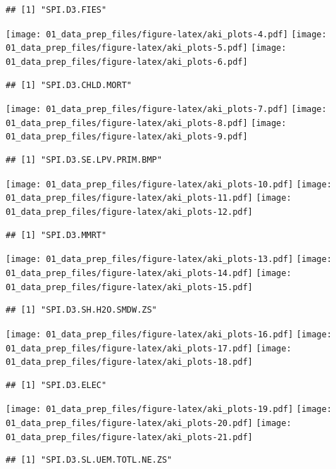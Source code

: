 \documentclass[]{article}
\begin{document}
\begin{verbatim}
## [1] "SPI.D3.FIES"
\end{verbatim}

\texttt{[image: 01\_data\_prep\_files/figure-latex/aki\_plots-4.pdf]}
\texttt{[image: 01\_data\_prep\_files/figure-latex/aki\_plots-5.pdf]}
\texttt{[image: 01\_data\_prep\_files/figure-latex/aki\_plots-6.pdf]}

\begin{verbatim}
## [1] "SPI.D3.CHLD.MORT"
\end{verbatim}

\texttt{[image: 01\_data\_prep\_files/figure-latex/aki\_plots-7.pdf]}
\texttt{[image: 01\_data\_prep\_files/figure-latex/aki\_plots-8.pdf]}
\texttt{[image: 01\_data\_prep\_files/figure-latex/aki\_plots-9.pdf]}

\begin{verbatim}
## [1] "SPI.D3.SE.LPV.PRIM.BMP"
\end{verbatim}

\texttt{[image: 01\_data\_prep\_files/figure-latex/aki\_plots-10.pdf]}
\texttt{[image: 01\_data\_prep\_files/figure-latex/aki\_plots-11.pdf]}
\texttt{[image: 01\_data\_prep\_files/figure-latex/aki\_plots-12.pdf]}

\begin{verbatim}
## [1] "SPI.D3.MMRT"
\end{verbatim}

\texttt{[image: 01\_data\_prep\_files/figure-latex/aki\_plots-13.pdf]}
\texttt{[image: 01\_data\_prep\_files/figure-latex/aki\_plots-14.pdf]}
\texttt{[image: 01\_data\_prep\_files/figure-latex/aki\_plots-15.pdf]}

\begin{verbatim}
## [1] "SPI.D3.SH.H2O.SMDW.ZS"
\end{verbatim}

\texttt{[image: 01\_data\_prep\_files/figure-latex/aki\_plots-16.pdf]}
\texttt{[image: 01\_data\_prep\_files/figure-latex/aki\_plots-17.pdf]}
\texttt{[image: 01\_data\_prep\_files/figure-latex/aki\_plots-18.pdf]}

\begin{verbatim}
## [1] "SPI.D3.ELEC"
\end{verbatim}

\texttt{[image: 01\_data\_prep\_files/figure-latex/aki\_plots-19.pdf]}
\texttt{[image: 01\_data\_prep\_files/figure-latex/aki\_plots-20.pdf]}
\texttt{[image: 01\_data\_prep\_files/figure-latex/aki\_plots-21.pdf]}

\begin{verbatim}
## [1] "SPI.D3.SL.UEM.TOTL.NE.ZS"
\end{verbatim}
\end{document}
